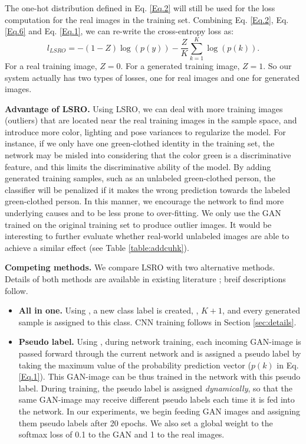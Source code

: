 \documentclass[10pt,twocolumn,letterpaper]{article}
\begin{document}
The one-hot distribution defined in Eq. \ref{Eq.2} will still be used for the loss computation for the real images in the training set. 
Combining Eq. \ref{Eq.2}, Eq. \ref{Eq.6} and Eq. \ref{Eq.1}, we can re-write the cross-entropy loss as:
\begin{equation}
l_{LSRO} = -(1-Z) \log{(p(y))} 
- \frac{Z}{K} \sum_{k=1}^{K} \log{(p(k))}.
\label{Eq.7}
\end{equation}
For a real training image, $Z=0$. For a generated training image, $Z=1$. So our system actually has two types of losses, one for real images and one for generated images. 


\textbf{Advantage of LSRO.} Using LSRO, we can deal with more training images (outliers) that are located near the real training images in the sample space, and introduce more color, lighting and pose variances to regularize the model. For instance, if we only have one green-clothed identity in the training set, the network may be misled into considering that the color green is a discriminative feature, and this limits the discriminative ability of the model. By adding generated training samples, such as an unlabeled green-clothed person, the classifier will be penalized if it makes the wrong prediction towards the labeled green-clothed person. In this manner, we encourage the network to find more underlying causes and to be less prone to over-fitting. We only use the GAN trained on the original training set to produce outlier images. It would be interesting to further evaluate whether real-world unlabeled images are able to achieve a similar effect (see Table \ref{table:addcuhk}).

\textbf{Competing methods.} We compare LSRO with two alternative methods. Details of both methods are available in existing literature \cite{odena2016semi,salimans2016improved,lee2013pseudo}; breif descriptions follow.
\begin{itemize}
\item \textbf{All in one.} Using \cite{odena2016semi,salimans2016improved}, a new class label is created, \ie, $K+1$, and every generated sample is assigned to this class. CNN training follows in Section \ref{sec:details}.
\item \textbf{Pseudo label.} Using \cite{lee2013pseudo}, during network training, each incoming GAN-image is passed forward through the current network and is assigned a pseudo label by taking the maximum value of the probability prediction vector ($p(k)$ in Eq. \ref{Eq.1}). This GAN-image can be thus trained in the network with this pseudo label. During training, the pseudo label is assigned \emph{dynamically}, so that the same GAN-image may receive different pseudo labels each time it is fed into the network. In our experiments, we begin feeding GAN images and assigning them pseudo labels after 20 epochs. We also set a global weight to the softmax loss of 0.1 to the GAN and 1 to the real images.
\end{itemize}
\end{document}
